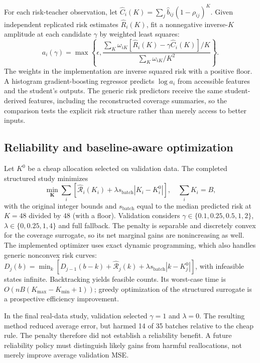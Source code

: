 \documentclass[10pt,letterpaper]{article}
\begin{document}
For each risk-teacher observation, let $\widehat C_i(K)=\sum_j\widehat b_{ij}(1-\rho_{ij})^K$. Given independent replicated risk estimates $\widehat R_i(K)$, fit a nonnegative inverse-$K$ amplitude at each candidate $\gamma$ by weighted least squares:
\begin{equation}
 a_i(\gamma)=\max\left\{\epsilon,\frac{\sum_K \omega_{iK}[\widehat R_i(K)-\gamma\widehat C_i(K)]/K}{\sum_K\omega_{iK}/K^2}\right\}.
\end{equation}
The weights in the implementation are inverse squared risk with a positive floor. A histogram gradient-boosting regressor predicts $\log a_i$ from accessible features and the student's outputs. The generic risk predictors receive the same student-derived features, including the reconstructed coverage summaries, so the comparison tests the explicit risk structure rather than merely access to better inputs.
\subsection{Reliability and baseline-aware optimization}
Let $K^0$ be a cheap allocation selected on validation data. The completed structured study minimizes
\begin{equation}
 \min_{\mathbf K}\sum_i\left[\widehat{\mathcal R}_i(K_i)+\lambda s_{\mathrm{batch}}|K_i-K_i^0|\right],\quad \sum_i K_i=B,\label{eq:penalty}
\end{equation}
with the original integer bounds and $s_{\mathrm{batch}}$ equal to the median predicted risk at $K=48$ divided by 48 (with a floor). Validation considers $\gamma\in\{0.1,0.25,0.5,1,2\}$, $\lambda\in\{0,0.25,1,4\}$ and full fallback. The penalty is separable and discretely convex for the coverage surrogate, so its net marginal gains are nonincreasing as well. The implemented optimizer uses exact dynamic programming, which also handles generic nonconvex risk curves: $D_j(b)=\min_k[D_{j-1}(b-k)+\widehat{\mathcal R}_j(k)+\lambda s_{\mathrm{batch}}|k-K_j^0|]$, with infeasible states infinite. Backtracking yields feasible counts. Its worst-case time is $O(nB(K_{\max}-K_{\min}+1))$; greedy optimization of the structured surrogate is a prospective efficiency improvement.

In the final real-data study, validation selected $\gamma=1$ and $\lambda=0$. The resulting method reduced average error, but harmed 14 of 35 batches relative to the cheap rule. The penalty therefore did not establish a reliability benefit. A future reliability policy must distinguish likely gains from harmful reallocations, not merely improve average validation MSE.
\end{document}
